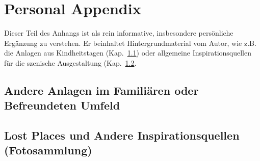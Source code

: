 \section{Personal Appendix}
\label{sec:personalAppendix}

Dieser Teil des Anhangs ist als rein informative, insbesondere pers\"onliche Erg\"anzung zu verstehen.
Er beinhaltet Hintergrundmaterial vom Autor, wie z.B. die Anlagen aus Kindheitstagen (Kap.~\ref{sec:personalAppendix_elderTracks}) oder allgemeine Inspirationsquellen f\"ur die szenische Ausgestaltung (Kap.~\ref{sec:personalAppendix_lostPlaces}.




\subsection{Andere Anlagen im Famili\"aren oder Befreundeten Umfeld}
\label{sec:personalAppendix_elderTracks}



\subsection{Lost Places und Andere Inspirationsquellen (Fotosammlung)}
\label{sec:personalAppendix_lostPlaces}


